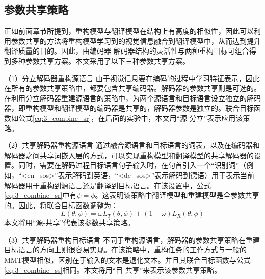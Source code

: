 \subsection{参数共享策略}
正如前面章节所提到，重构模型与翻译模型在结构上有高度的相似性，因此可以利用参数共享的方法将重构模型学习到的视觉信息融合到翻译模型中，从而达到提升翻译质量的目的。因此，由编码器-解码器结构的灵活性与两种重构目标可组合得到多种参数共享方案。本文采用了以下三种参数共享方案。

（1）{\sffamily 分立解码器重构源语言}
由于视觉信息要在编码的过程中学习特征表示，因此在所有的参数共享策略中，都要包含共享编码器。解码器的参数共享则是可选的。在利用分立解码器重建源语言的策略中，为两个源语言和目标语言设立独立的解码器，即重构模型和翻译模型的编码器是共享的，解码器参数是独立的。联合目标函数如公式\ref{eq:3_combine_sr}，在后面的实验中，本文用“源-分立”表示应用该策略。

（2）{\sffamily 共享解码器重构源语言}
通过融合源语言和目标语言的词表，以及在编码器和解码器之间共享词嵌入层的方式，可以实现重构模型和翻译模型的共享解码器的设置。同时，需要在解码过程目标语言句子输入时，在句首引入一个“识别词”（例如，“<en\_sos>”表示解码到英语，“<de\_sos>”表示解码到德语）用于表示当前解码器用于重构到源语言还是翻译到目标语言。在该设置中，公式\ref{eq:3_combine_sr}中有$\psi=\phi$。这表明该策略中翻译模型和重建模型是全参数共享的。因此，将联合目标函数调整为：
\begin{equation}
    L(\theta, \phi)=\omega L_T(\theta, \phi) + (1-\omega)L_R(\theta, \phi)
    \label{eq:3_combine_ss}
\end{equation}
本文将用“源-共享”代表该参数共享策略。

（3）{\sffamily 共享解码器重构目标语言}
不同于重构源语言，解码器的参数共享策略在重建目标语言的方向上则很容易实现。在该策略中，重构任务的工作方式与一般的MMT模型相似，区别在于输入的文本是退化文本。并且其联合目标函数与公式\ref{eq:3_combine_ss}相同。本文将用“目-共享”来表示该参数共享策略。